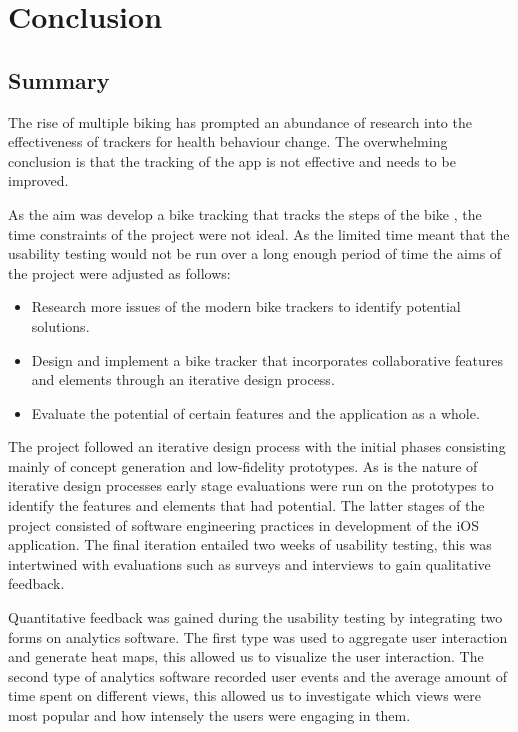 \documentclass{l4proj}
\begin{document}
\chapter{Conclusion}   

\section{Summary}

The rise of multiple biking has prompted an abundance of research into the effectiveness of trackers for health behaviour change. The overwhelming conclusion is that the tracking of the app is not effective and needs to be improved.
 


As the aim was develop a bike tracking that tracks the steps of the bike , the time constraints of the project were not ideal. As the limited time meant that the usability testing would not be run over a long enough period of time the aims of the project were adjusted as follows: 

\begin{itemize}
    \item Research more issues of the modern bike trackers to identify potential solutions.
    \item Design and implement a bike tracker that incorporates collaborative features and  elements through an iterative design process. 
    \item Evaluate the potential of certain features and the application as a whole.
\end{itemize}

The project followed an iterative design process with the initial phases consisting mainly of concept generation and low-fidelity prototypes. As is the nature of iterative design processes early stage evaluations were run on the prototypes to identify the features and elements that had potential. The latter stages of the project consisted of software engineering practices in development of the iOS application. The final iteration entailed two weeks of usability testing, this was intertwined with evaluations such as surveys and interviews to gain qualitative feedback.

Quantitative feedback was gained during the usability testing by integrating two forms on analytics software. The first type was used to aggregate user interaction and generate heat maps, this allowed us to visualize the user interaction. The second type of analytics software recorded user events and the average amount of time spent on different views, this allowed us to investigate which views were most popular and how intensely the users were engaging in them. 
\end{document}
